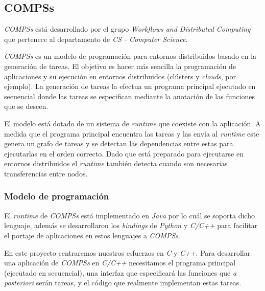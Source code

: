 \subsection{COMPSs}

\textit{COMPSs} está desarrollado por el grupo \textit{Workflows and Distributed Computing} que pertenece al departamento de \textit{CS - Computer Science}.
\par\bigskip

\textit{COMPSs} es un modelo de programación para entornos distribuidos basado en la generación de tareas. El objetivo es hacer más sencilla la programación de aplicaciones y su ejecución en entornos distribuidos (clústers y \textit{clouds}, por ejemplo). La generación de tareas la efectua un programa principal ejecutado en secuencial donde las tareas se especifican mediante la anotación de las funciones que se deseen.   

\par\bigskip

El modelo está dotado de un sistema de \textit{runtime} que coexiste con la aplicación. A medida que el programa principal encuentra las tareas y las envía al \textit{runtime} este genera un grafo de tareas y se detectan las dependencias entre estas para ejecutarlas en el orden correcto. Dado que está preparado para ejecutarse en entornos distribuidos el \textit{runtime} también detecta cuando son necesarias transferencias entre nodos.

\subsubsection{Modelo de programación} 
\label{compss_pm}

El \textit{runtime} de \textit{COMPSs} está implementado en \textit{Java} por lo cuál se soporta dicho lenguaje, además se desarrollaron los \textit{bindings} de \textit{Python}\cite{tejedor2017pycompss} y \textit{C/C++} para facilitar el portaje de aplicaciones en estos lenguajes a \textit{COMPSs}. 
\par\bigskip

En este proyecto centraremos nuestros esfuerzos en \textit{C} y \textit{C++}. Para desarrollar una aplicación de \textit{COMPSs} en \textit{C/C++} necesitamos el programa principal (ejecutado en secuencial), una interfaz que especificará las funciones que \textit{a posteriori} serán tareas, y el código que realmente implementan estas tareas. 
\par\bigskip


